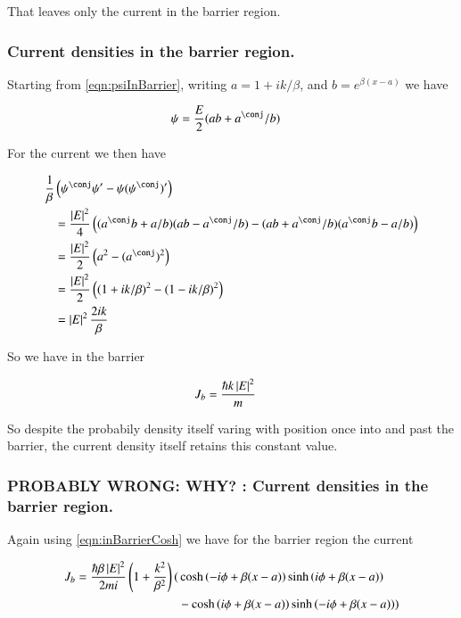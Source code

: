 \documentclass{article}
\begin{document}
That leaves only the current in the barrier region.

\subsubsection{ Current densities in the barrier region. }

Starting from \ref{eqn:psiInBarrier}, writing $a = 1 + ik/\beta$, and $b=e^{\beta(x-a)}$ we have

\begin{align*}
\psi &= \frac{E}{2} (a b + a^\conj/b)
\end{align*}

For the current we then have

\begin{align*}
\inv{\beta}&\left(\psi^\conj \psi' - \psi (\psi^\conj)' \right) \\
&=
\frac{\Abs{E}^2}{4}
\left(
(a^\conj b + a/b) (a b - a^\conj/b)
-(a b + a^\conj/b) (a^\conj b - a/b)
\right) \\
&=
\frac{\Abs{E}^2}{2} \left(a^2 - (a^\conj)^2 \right) \\
&=
\frac{\Abs{E}^2}{2} \left( 
(1 + ik/\beta)^2
-(1 - ik/\beta)^2
 \right) \\
&=
\Abs{E}^2 \frac{2ik}{\beta}
\end{align*}

So we have in the barrier

\begin{align*}
J_b 
&=
\frac{\hbar k \left\lvert{E}\right\rvert^2 }{m}
\end{align*}

So despite the probabily density itself varing with position once into and past the barrier, the current density itself
retains this
constant value.

\subsubsection{ PROBABLY WRONG: WHY? : Current densities in the barrier region. }

Again using \ref{eqn:inBarrierCosh} we have for the barrier region the current

\begin{align*}
J_b
= \frac{\hbar \beta \left\lvert{E}\right\rvert^2}{2mi} \left(1 + \frac{k^2}{\beta^2} \right)
( 
&\cosh\left( -i\phi + \beta(x-a) \right) 
\sinh\left( i\phi + \beta(x-a) \right) \\
&-
\cosh\left( i\phi + \beta(x-a) \right) 
\sinh\left( -i\phi + \beta(x-a) \right) 
) \\
\end{align*}
\end{document}
